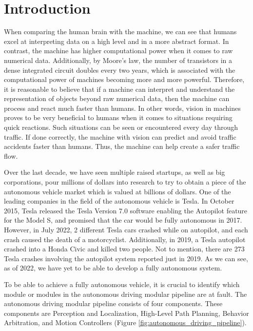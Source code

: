 \chapter{Introduction} \label{sec:introduction}

When comparing the human brain with the machine, we can see that humans excel at interpreting data on a high level and in a more abstract format. In contrast, the machine has higher computational power when it comes to raw numerical data. Additionally, by Moore's law, the number of transistors in a dense integrated circuit doubles every two years, which is associated with the computational power of machines becoming more and more powerful. Therefore, it is reasonable to believe that if a machine can interpret and understand the representation of objects beyond raw numerical data, then the machine can process and react much faster than humans. In other words, vision in machines proves to be very beneficial to humans when it comes to situations requiring quick reactions. Such situations can be seen or encountered every day through traffic. If done correctly, the machine with vision can predict and avoid traffic accidents faster than humans. Thus, the machine can help create a safer traffic flow.

Over the last decade, we have seen multiple raised startups, as well as big corporations, pour millions of dollars into research to try to obtain a piece of the autonomous vehicle market which is valued at billions of dollars. One of the leading companies in the field of the autonomous vehicle is Tesla. In October 2015, Tesla released the Tesla Version 7.0 software enabling the Autopilot feature for the Model S, and promised that the car would be fully autonomous in 2017. However, in July 2022, 2 different Tesla cars crashed while on autopilot, and each crash caused the death of a motorcyclist. Additionally, in 2019, a Tesla autopilot crashed into a Honda Civic and killed two people. Not to mention, there are 273 Tesla crashes involving the autopilot system reported just in 2019. As we can see, as of 2022, we have yet to be able to develop a fully autonomous system.

To be able to achieve a fully autonomous vehicle, it is crucial to identify which module or modules in the autonomous driving modular pipeline are at fault. The autonomous driving modular pipeline consists of four components. These components are Perception and Localization, High-Level Path Planning, Behavior Arbitration, and Motion Controllers (Figure \ref{fig:autonomous_driving_pipeline}).

